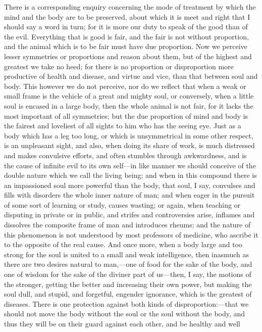 There is a corresponding enquiry concerning the mode of treatment by which
the mind and the body are to be preserved, about which it is meet and
right that I should say a word in turn; for it is more our duty to speak
of the good than of the evil. Everything that is good is fair, and the
fair is not without proportion, and the animal which is to be fair must
have due proportion. Now we perceive lesser symmetries or proportions and
reason about them, but of the highest and greatest we take no heed; for
there is no proportion or disproportion more productive of health and
disease, and virtue and vice, than that between soul and body. This
however we do not perceive, nor do we reflect that when a weak or small
frame is the vehicle of a great and mighty soul, or conversely, when a
little soul is encased in a large body, then the whole animal is not fair,
for it lacks the most important of all symmetries; but the due proportion
of mind and body is the fairest and loveliest of all sights to him who has
the seeing eye. Just as a body which has a leg too long, or which is
unsymmetrical in some other respect, is an unpleasant sight, and also,
when doing its share of work, is much distressed and makes convulsive
efforts, and often stumbles through awkwardness, and is the cause of
infinite evil to its own self—in like manner we should conceive of
the double nature which we call the living being; and when in this
compound there is an impassioned soul more powerful than the body, that
soul, I say, convulses and fills with disorders the whole inner nature of
man; and when eager in the pursuit of some sort of learning or study,
causes wasting; or again, when teaching or disputing in private or in
public, and strifes and controversies arise, inflames and dissolves the
composite frame of man and introduces rheums; and the nature of this
phenomenon is not understood by most professors of medicine, who ascribe
it to the opposite of the real cause. And once more, when a body large and
too strong for the soul is united to a small and weak intelligence, then
inasmuch as there are two desires natural to man,—one of food for
the sake of the body, and one of wisdom for the sake of the diviner part
of us—then, I say, the motions of the stronger, getting the better
and increasing their own power, but making the soul dull, and stupid, and
forgetful, engender ignorance, which is the greatest of diseases. There is
one protection against both kinds of disproportion:—that we should
not move the body without the soul or the soul without the body, and thus
they will be on their guard against each other, and be healthy and well
